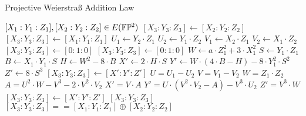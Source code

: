 \begin{algorithm}\caption{Projective Weierstraß Addition Law}
\label{alg_projective_group_law}
\begin{algorithmic}[0]
\Require $[X_1:Y_1:Z_1],[X_2:Y_2:Z_2] \in E(\mathbb{F}\mathbb{P}^2)$
\If{$[X_1:Y_1:Z_1] == [0:1:0]$}
  \State $[X_3:Y_3:Z_3] \gets [X_2:Y_2:Z_2]$
\ElsIf{$[X_2:Y_2:Z_2] == [0:1:0]$}
  \State $[X_3:Y_3:Z_3] \gets [X_1:Y_1:Z_1]$
\Else
  \State $U_1 \gets Y_2\cdot Z_1$
  \State $U_2 \gets Y_1\cdot Z_2$
  \State $V_1 \gets X_2\cdot Z_1$
  \State $V_2 \gets X_1\cdot Z_2$
      $[X_3:Y_3:Z_3] \gets [0:1:0]$
    \Else
        $[X_3:Y_3:Z_3] \gets [0:1:0]$
      \Else
        \State $W \gets a\cdot Z_1^2 + 3\cdot X_1^2$
        \State $S \gets Y_1\cdot Z_1$
        \State $B \gets X_1\cdot Y_1\cdot S$
        \State $H \gets W^2 - 8\cdot B$
        \State $X' \gets 2\cdot H\cdot S$
        \State $Y' \gets W\cdot (4\cdot B - H) - 8\cdot Y_1^2\cdot S^2$
        \State $Z' \gets 8\cdot S^3$
        \State $[X_3:Y_3:Z_3] \gets [X':Y':Z']$
      \EndIf
    \EndIf
  \Else
    \State $U = U_1 - U_2$
    \State $V = V_1 - V_2$
    \State $W = Z_1\cdot Z_2$
    \State $A = U^2\cdot W - V^3 - 2\cdot V^2\cdot V_2$
    \State $X' = V\cdot A$
    \State $Y' = U\cdot(V^2\cdot V_2 - A) - V^3\cdot U_2$
    \State $Z' = V^3\cdot W$
    \State $[X_3:Y_3:Z_3]\gets [X':Y':Z']$
  \EndIf
\EndIf
\State {} $[X_3:Y_3:Z_3]$
\EndProcedure
\Ensure $ [X_3:Y_3:Z_3] == [X_1:Y_1:Z_1] \oplus [X_2:Y_2:Z_2]$
\end{algorithmic}
\end{algorithm}


